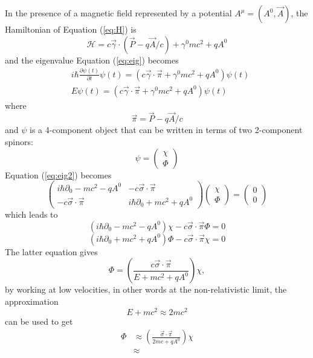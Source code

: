 \documentclass{outhesis}
\begin{document}
In the presence of a magnetic field represented by a potential $A^{\mu}=(A^0, \overrightarrow{A})$, the Hamiltonian of Equation (\ref{eq:H}) is
\begin{equation}
\label{eq:HB}
\mathcal{H} = c \overrightarrow{\gamma}\cdot \left(\overrightarrow{P}-q\overrightarrow{A}/c\right) + \gamma^0mc^2+qA^0
\end{equation}
and the eigenvalue Equation (\ref{eq:eig}) becomes
\begin{equation}
\label{eq:eig2}
\begin{split}
&i\hbar \frac{\partial \psi(t)}{\partial t}  \psi(t) = \left( c\overrightarrow{\gamma}\cdot \overrightarrow{\pi} + \gamma^0mc^2 + qA^0 \right)\psi(t)\\
& E \psi(t) = \left( c\overrightarrow{\gamma}\cdot \overrightarrow{\pi} + \gamma^0mc^2 + qA^0 \right)\psi(t)	
\end{split}
\end{equation}
where 
\[ \overrightarrow{\pi} =  \overrightarrow{P}-q \overrightarrow{A}/c \]
and $\psi$ is a 4-component object that can be written in terms of two 2-component spinors:
\[
\psi = 
\begin{pmatrix}
\chi \\
\Phi
\end{pmatrix}
\]
Equation (\ref{eq:eig2}) becomes
\begin{equation}
\label{eq:eig3}
\begin{pmatrix}
i\hbar\partial_0-mc^2-qA^0 & -c\overrightarrow{\sigma}\cdot \overrightarrow{\pi}\\
-c\overrightarrow{\sigma}\cdot \overrightarrow{\pi} & i\hbar\partial_0+mc^2+qA^0
\end{pmatrix}
\begin{pmatrix}
\chi \\
\Phi
\end{pmatrix}
=
\begin{pmatrix}
0 \\
0
\end{pmatrix}
\end{equation}
which leads to
\begin{equation}
\left( i\hbar\partial_0-mc^2-qA^0 \right)\chi -c\overrightarrow{\sigma}\cdot \overrightarrow{\pi}\Phi = 0
\end{equation}
\begin{equation}
\left( i\hbar\partial_0+mc^2+qA^0 \right)\Phi -c\overrightarrow{\sigma}\cdot \overrightarrow{\pi}\chi = 0
\end{equation}
The latter equation gives
\begin{equation}
\Phi = \left(\frac{c\overrightarrow{\sigma}\cdot \overrightarrow{\pi}}{ E+mc^2+qA^0 }\right) \chi,
\end{equation}
by working at low velocities, in other words at the non-relativistic limit, the approximation
\[E + mc^2 \approx 2mc^2\]
can be used to get 
\begin{equation}
\begin{split}
\Phi &\approx \left(\frac{\overrightarrow{\sigma}\cdot \overrightarrow{\pi}}{ 2mc+qA^0 }\right) \chi\\
& \approx 
\end{split}
\end{equation}
\end{document}
